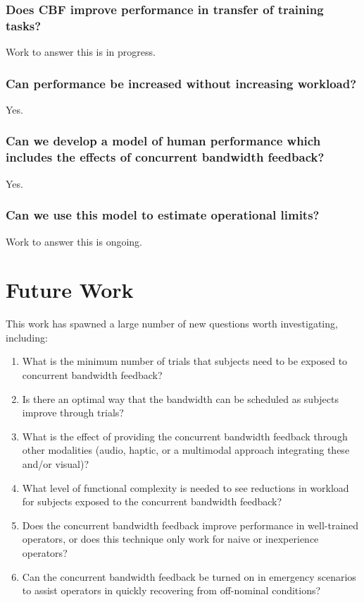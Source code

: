\subsubsection{Does CBF improve performance in transfer of training tasks?}
Work to answer this is in progress.

\subsubsection{Can performance be increased without increasing workload?}
Yes.

\subsubsection{Can we develop a model of human performance which includes the effects of concurrent bandwidth feedback?}
Yes.

\subsubsection{Can we use this model to estimate operational limits?}
Work to answer this is ongoing.


\section{Future Work}

This work has spawned a large number of new questions worth investigating, including:
\begin{enumerate}
    \item What is the minimum number of trials that subjects need to be exposed to concurrent bandwidth feedback?
    \item Is there an optimal way that the bandwidth can be scheduled as subjects improve through trials?
    \item What is the effect of providing the concurrent bandwidth feedback through other modalities (audio, haptic, or a multimodal approach integrating these and/or visual)?
    \item What level of functional complexity is needed to see reductions in workload for subjects exposed to the concurrent bandwidth feedback?
    \item Does the concurrent bandwidth feedback improve performance in well-trained operators, or does this technique only work for naive or inexperience operators?
    \item Can the concurrent bandwidth feedback be turned on in emergency scenarios to assist operators in quickly recovering from off-nominal conditions?
\end{enumerate}
